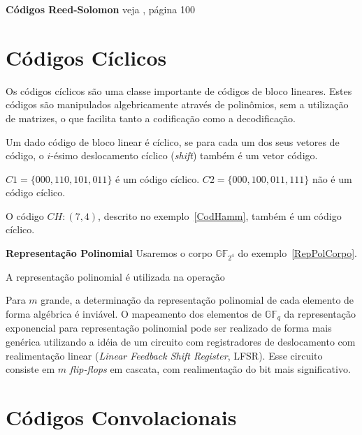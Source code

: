 \begin{example} {\bf Códigos Reed-Solomon} veja \cite{Hefez:2008}, página 100
\end{example}

\section{Códigos Cíclicos}

Os códigos cíclicos são uma classe importante de códigos de bloco lineares. Estes códigos são manipulados algebricamente através de polinômios, sem a utilização de matrizes, o que facilita tanto a codificação como a decodificação.

\begin{definition} Um dado código de bloco linear é cíclico, se para cada um dos seus vetores de código, o $i$-ésimo deslocamento cíclico (\emph{shift}) também é um vetor código.
\end{definition}

\begin{example}
$C1 = \{000, 110, 101, 011\}$ é um código cíclico. $C2 = \{000, 100, 011, 111\}$ não é um código cíclico.

O código $CH:(7,4)$, descrito no exemplo~\ref{CodHamm}, também é um código cíclico.
\end{example}

\begin{definition} {\bf Representação Polinomial} \label{RepPol} 
Usaremos o corpo $\mathbb{GF}_{2^4}$ do exemplo~\ref{RepPolCorpo}.
\end{definition}



A representação polinomial é utilizada na operação 

Para $m$ grande, a determinação da representação polinomial de cada elemento de forma algébrica é inviável. O mapeamento dos elementos de $\mathbb{GF}_q$ da representação exponencial para representação polinomial pode ser realizado de forma mais genérica utilizando a idéia de um circuito com registradores de deslocamento com realimentação linear (\emph{Linear Feedback Shift Register}, LFSR). Esse circuito consiste em $m$ \emph{flip-flops} em cascata, com realimentação do bit mais significativo. 

\section{Códigos Convolacionais}

